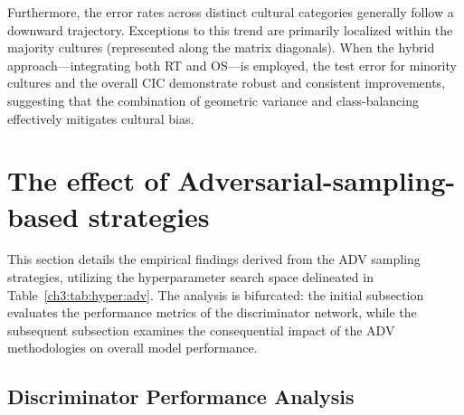 Furthermore, the error rates across distinct cultural categories generally follow a downward trajectory. 
Exceptions to this trend are primarily localized within the majority cultures (represented along the matrix diagonals). 
When the hybrid approach—integrating both RT and OS—is employed, the test error for minority cultures and the overall CIC demonstrate robust and consistent improvements, suggesting that the combination of geometric variance and class-balancing effectively mitigates cultural bias.
%

\section{The effect of Adversarial-sampling-based strategies}
This section details the empirical findings derived from the ADV sampling strategies, utilizing the hyperparameter search space delineated in Table~\ref{ch3:tab:hyper:adv}. 
The analysis is bifurcated: the initial subsection evaluates the performance metrics of the discriminator network, while the subsequent subsection examines the consequential impact of the ADV methodologies on overall model performance.
\subsection{Discriminator Performance Analysis}
\label{sec:res:discr}

